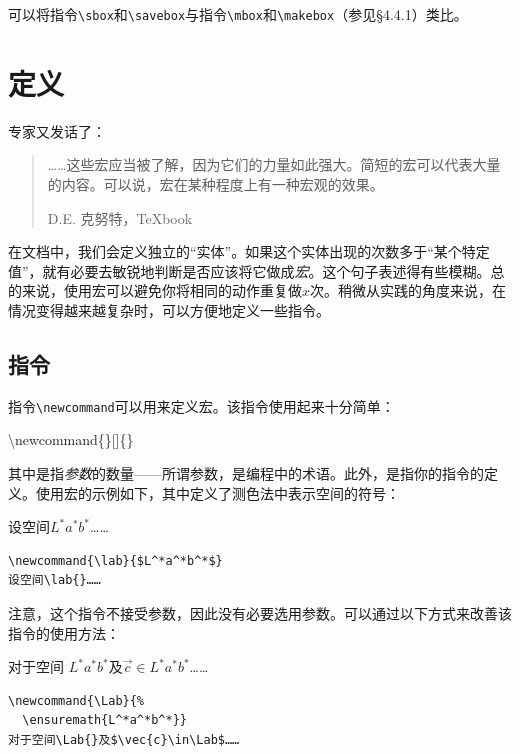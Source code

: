 可以将指令\verb|\sbox|和\verb|\savebox|与指令\verb|\mbox|和\verb|\makebox|（参见\S 4.4.1）类比。

\section{定义}

专家又发话了：

\begin{quote}
  ……这些宏应当被了解，因为它们的力量如此强大。简短的宏可以代表大量的内容。可以说，宏在某种程度上有一种宏观的效果。
  
  \hfill D.E. 克努特，\TeX book
\end{quote}

在文档中，我们会定义独立的“实体”。如果这个实体出现的次数多于“某个特定值”，就有必要去敏锐地判断是否应该将它做成\emph{宏}。这个句子表述得有些模糊。总的来说，使用宏可以避免你将相同的动作重复做$x$次。稍微从实践的角度来说，在情况变得越来越复杂时，可以方便地定义一些指令。

\subsection{指令}

指令\verb|\newcommand|可以用来定义宏。该指令使用起来十分简单：

\begin{dmd}
\backslash newcommand\{\}[]\{\}
\end{dmd}

其中是指\emph{参数}的数量——所谓参数，是编程中的术语。此外，是指你的指令的定义。使用宏的示例如下，其中定义了测色法中表示空间的符号：

\begin{codelist}[4.18]{
  \newcommand{\lab}{$L^*a^*b^*$}
设空间\lab{}……
}
\begin{verbatim}
\newcommand{\lab}{$L^*a^*b^*$}
设空间\lab{}……\end{verbatim}
\end{codelist}

注意，这个指令不接受参数，因此没有必要选用参数。可以通过以下方式来改善该指令的使用方法：

\begin{codelist}[4.19]{
\newcommand{\Lab}{
  \ensuremath{L^*a^*b^*}}
对于空间\Lab{}及$\vec{c}\in\Lab$……
}
\begin{verbatim}
\newcommand{\Lab}{%
  \ensuremath{L^*a^*b^*}}
对于空间\Lab{}及$\vec{c}\in\Lab$……\end{verbatim}
\end{codelist}


